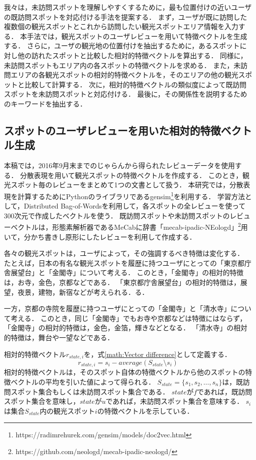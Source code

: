 \documentclass[submit]{ipsj}
\begin{document}
我々は，未訪問スポットを理解しやすくするために，最も位置付けの近いユーザの既訪問スポットを対応付ける手法を提案する．
まず，ユーザが既に訪問した複数個の観光スポットとこれから訪問したい観光スポットエリア情報を入力する．
本手法では，観光スポットのユーザレビューを用いて特徴ベクトルを生成する．
さらに，ユーザの観光地の位置付けを抽出するために，あるスポットに対し他の訪れたスポットと比較した相対的特徴ベクトルを算出する．
同様に，未訪問スポットもエリア内の各スポットの特徴ベクトルを求める．
また，未訪問エリアの各観光スポットの相対的特徴ベクトルを，そのエリアの他の観光スポットと比較して計算する．
次に，相対的特徴ベクトルの類似度によって既訪問スポットを未訪問スポットと対応付ける．
最後に，その関係性を説明するためのキーワードを抽出する．

\subsection{スポットのユーザレビューを用いた相対的特徴ベクトル生成}
\label{subsec:スポットのレビューから相対的特徴ベクトル生成}
本稿では，2016年9月末までのじゃらんから得られたレビューデータを使用する．
分散表現\cite{Le}を用いて観光スポットの特徴ベクトルを作成する．
このとき，観光スポット毎のレビューをまとめて1つの文書として扱う．
本研究では，分散表現を計算するためにPythonのライブラリであるgensim\footnote{https://radimrehurek.com/gensim/models/doc2vec.html}を利用する．
学習方法として，Distributed Bag-of-Wordsを利用して，各スポットの全レビューを使って300次元で作成したベクトルを使う．
既訪問スポットや未訪問スポットのレビューベクトルは，形態素解析器であるMeCab\cite{Kudo}に辞書「mecab-ipadic-NEologd」\footnote{https://github.com/neologd/mecab-ipadic-neologd/}用いて，分かち書きし原形にしたレビューを利用して作成する．

各々の観光スポットは，ユーザによって，その強調するべき特徴は変化する．
たとえば，日本の有名な観光スポットを履歴に持つユーザにとっての「東京都庁舎展望台」と「金閣寺」について考える．
このとき，「金閣寺」の相対的特徴は，お寺，金色，京都などである．
「東京都庁舎展望台」の相対的特徴は，展望，夜景，建物，新宿などが考えられる．る．

一方，京都の寺院を履歴に持つユーザにとっての「金閣寺」と「清水寺」について考える．
このとき，同じ「金閣寺」でもお寺や京都などは特徴にはならず，「金閣寺」の相対的特徴は，金色，金箔，輝きなどとなる．
「清水寺」の相対的特徴は，舞台や一望などである．

相対的特徴ベクトル$r_{state,i}$を，式\ref{math:Vector difference}として定義する．
\begin{equation}
  r_{state,i}=s_i-average(S_{state} \setminus s_i)
  \label{math:Vector difference}
\end{equation}
相対的特徴ベクトルは，そのスポット自体の特徴ベクトルから他のスポットの特徴ベクトルの平均を引いた値によって得られる．
$S_{state} =\{s_1,s_2,\dots,s_n\}$は，既訪問スポット集合もしくは未訪問スポット集合である．
$state$が$f$であれば，既訪問スポット集合を意味し，$state$が$u$であれば，未訪問スポット集合を意味する．
$s_i$は集合$S_{state}$内の観光スポット$i$の特徴ベクトルを示している．
\end{document}
